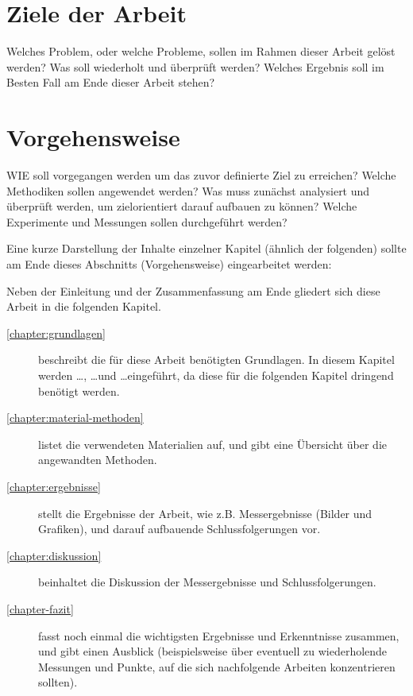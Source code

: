 \section{Ziele der Arbeit}

Welches Problem, oder welche Probleme, sollen im Rahmen dieser Arbeit gelöst werden? Was soll wiederholt und überprüft werden? Welches Ergebnis soll im Besten Fall am Ende dieser Arbeit stehen?

\section{Vorgehensweise}

WIE soll vorgegangen werden um das zuvor definierte Ziel zu erreichen? Welche Methodiken sollen angewendet werden? Was muss zunächst analysiert und überprüft werden, um zielorientiert darauf aufbauen zu können? Welche Experimente und Messungen sollen durchgeführt werden?

Eine kurze Darstellung der Inhalte einzelner Kapitel (ähnlich der folgenden) sollte am Ende dieses Abschnitts (Vorgehensweise) eingearbeitet werden:

Neben der Einleitung und der Zusammenfassung am Ende gliedert sich diese Arbeit in die folgenden Kapitel.
\begin{description}
  \item[\ref{chapter:grundlagen}] beschreibt die für diese Arbeit benötigten Grundlagen. In diesem Kapitel werden \ldots, \ldots und \ldots eingeführt, da diese für die folgenden Kapitel dringend benötigt werden.
  \item[\ref{chapter:material-methoden}] listet die verwendeten Materialien auf, und gibt eine Übersicht über die angewandten Methoden.
  \item[\ref{chapter:ergebnisse}] stellt die Ergebnisse der Arbeit, wie z.B. Messergebnisse (Bilder und Grafiken), und darauf aufbauende Schlussfolgerungen vor.
  \item[\ref{chapter:diskussion}] beinhaltet die Diskussion der Messergebnisse und Schlussfolgerungen.
  \item[\ref{chapter-fazit}] fasst noch einmal die wichtigsten Ergebnisse und Erkenntnisse zusammen, und gibt einen Ausblick (beispielsweise über eventuell zu wiederholende Messungen und Punkte, auf die sich nachfolgende Arbeiten konzentrieren sollten).
\end{description}

